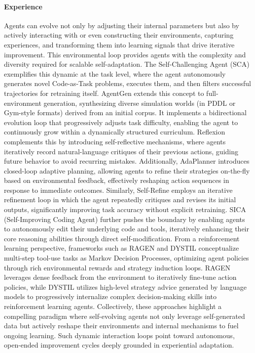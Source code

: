 \paragraph{Experience}
Agents can evolve not only by adjusting their internal parameters but also by actively interacting with or even constructing their environments, capturing experiences, and transforming them into learning signals that drive iterative improvement. This environmental loop provides agents with the complexity and diversity required for scalable self-adaptation.
The Self-Challenging Agent (SCA)\citep{zhou2025selfchallenginglanguagemodelagents} exemplifies this dynamic at the task level, where the agent autonomously generates novel Code-as-Task problems, executes them, and then filters successful trajectories for retraining itself. AgentGen\citep{hu2024agentgen} extends this concept to full-environment generation, synthesizing diverse simulation worlds (in PDDL or Gym-style formats) derived from an initial corpus. It implements a bidirectional evolution loop that progressively adjusts task difficulty, enabling the agent to continuously grow within a dynamically structured curriculum. Reflexion\citep{shinn2023reflexion} complements this by introducing self-reflective mechanisms, where agents iteratively record natural-language critiques of their previous actions, guiding future behavior to avoid recurring mistakes.
Additionally, AdaPlanner\citep{sun2023adaplanner} introduces closed-loop adaptive planning, allowing agents to refine their strategies on-the-fly based on environmental feedback, effectively reshaping action sequences in response to immediate outcomes. Similarly, Self-Refine\citep{madaan2023selfrefine} employs an iterative refinement loop in which the agent repeatedly critiques and revises its initial outputs, significantly improving task accuracy without explicit retraining. SICA (Self-Improving Coding Agent)\citep{robeyns2025selfimprovingcodingagent} further pushes the boundary by enabling agents to autonomously edit their underlying code and tools, iteratively enhancing their core reasoning abilities through direct self-modification.
From a reinforcement learning perspective, frameworks such as RAGEN\citep{wang2025ragen} and DYSTIL\citep{wang2025dystildynamicstrategyinduction} conceptualize multi-step tool-use tasks as Markov Decision Processes, optimizing agent policies through rich environmental rewards and strategy induction loops. RAGEN leverages dense feedback from the environment to iteratively fine-tune action policies, while DYSTIL utilizes high-level strategy advice generated by language models to progressively internalize complex decision-making skills into reinforcement learning agents.
Collectively, these approaches highlight a compelling paradigm where self-evolving agents not only leverage self-generated data but actively reshape their environments and internal mechanisms to fuel ongoing learning. Such dynamic interaction loops point toward autonomous, open-ended improvement cycles deeply grounded in experiential adaptation.


